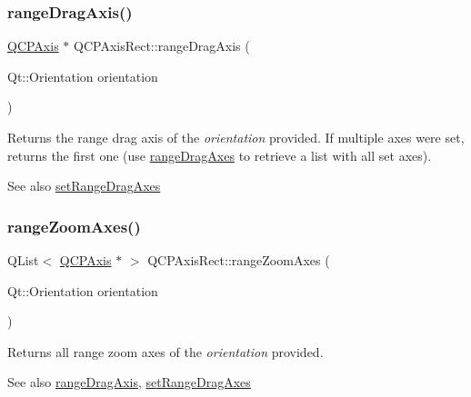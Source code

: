 \subsubsection{\texorpdfstring{range\+Drag\+Axis()}{rangeDragAxis()}}
{\footnotesize\ttfamily \hyperlink{class_q_c_p_axis}{Q\+C\+P\+Axis} $\ast$ Q\+C\+P\+Axis\+Rect\+::range\+Drag\+Axis (\begin{DoxyParamCaption}\item[{Qt\+::\+Orientation}]{orientation }\end{DoxyParamCaption})}

Returns the range drag axis of the {\itshape orientation} provided. If multiple axes were set, returns the first one (use \hyperlink{class_q_c_p_axis_rect_aae5f99a044ca911685a306f01b7ff941}{range\+Drag\+Axes} to retrieve a list with all set axes).

\begin{DoxySeeAlso}{See also}
\hyperlink{class_q_c_p_axis_rect_a648cce336bd99daac4a5ca3e5743775d}{set\+Range\+Drag\+Axes} 
\end{DoxySeeAlso}
\mbox{\label{class_q_c_p_axis_rect_a86aac0f435f209d60dacd22cda10c104}} 
\subsubsection{\texorpdfstring{range\+Zoom\+Axes()}{rangeZoomAxes()}}
{\footnotesize\ttfamily Q\+List$<$ \hyperlink{class_q_c_p_axis}{Q\+C\+P\+Axis} $\ast$ $>$ Q\+C\+P\+Axis\+Rect\+::range\+Zoom\+Axes (\begin{DoxyParamCaption}\item[{Qt\+::\+Orientation}]{orientation }\end{DoxyParamCaption})}

Returns all range zoom axes of the {\itshape orientation} provided.

\begin{DoxySeeAlso}{See also}
\hyperlink{class_q_c_p_axis_rect_a6d7c22cfc54fac7a3d6ef80b133a8574}{range\+Drag\+Axis}, \hyperlink{class_q_c_p_axis_rect_a648cce336bd99daac4a5ca3e5743775d}{set\+Range\+Drag\+Axes} 
\end{DoxySeeAlso}
\mbox{\label{class_q_c_p_axis_rect_a679c63f2b8daccfe6ec5110dce3dd3b6}} 
